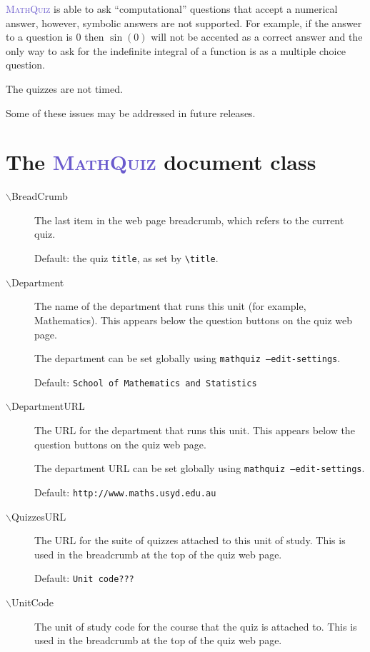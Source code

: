\documentclass[svgnames]{article}
\def\MathQuiz{\textcolor{SlateBlue}{\textsc{MathQuiz}}\xspace}
\begin{document}
    \MathQuiz is able to ask ``computational'' questions that accept a
    numerical answer, however, symbolic answers are not supported.
    For example, if the answer to a question is $0$ then $\sin(0)$ will
    not be accented as a correct answer and the only way to ask for the
    indefinite integral of a function is as a multiple choice question.

    The quizzes are not timed.

    Some of these issues may be addressed in future releases.

\section{The \MathQuiz document class}\label{S:documentclass}

\begin{description}
  \item[$\backslash$BreadCrumb]
     The last item in the web page breadcrumb, which refers to the current quiz.

     Default: the quiz \texttt{title}, as set by \verb!\title!.

  \item[$\backslash$Department]
    The name of the department that runs this unit (for example,
    Mathematics). This appears below the question buttons on the quiz web
    page.

    The department can be set globally using \texttt{mathquiz --edit-settings}.

    Default: \texttt{School of Mathematics and Statistics}

  \item[$\backslash$DepartmentURL]
    The URL for the department that runs this unit. This appears below
    the question buttons on the quiz web page.

    The department URL can be set globally using \texttt{mathquiz --edit-settings}.

    Default: \texttt{http://www.maths.usyd.edu.au}

  \item[$\backslash$QuizzesURL]
    The URL for the suite of quizzes attached to this unit of study. This
    is used in the breadcrumb at the top of the quiz web page.

    Default: \texttt{Unit code???}

  \item[$\backslash$UnitCode]
    The unit of study code for the course that the quiz is attached
    to. This is used in the breadcrumb at the top of the quiz web page.


\end{description}
\end{document}
